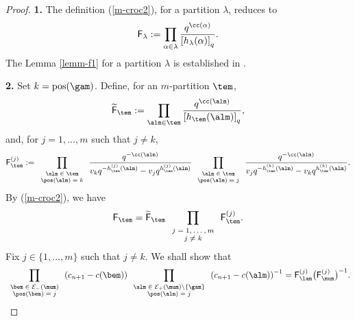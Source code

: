 \begin{proof}
{\bf 1.} The def\/inition (\ref{m-croc2}),  for a partition $\lambda$,  reduces to
\[
\textsf{F}_{\lambda}:=\prod_{\alpha\in \lambda}\frac{q^{\cc(\alpha)}}{\left[h_{\lambda}(\alpha)\right]_q} .
\]
The Lemma \ref{lemm-f1} for a partition $\lambda$ is established in \cite[Lemma 3.2]{IMO}.

{\bf 2.} Set $k=\text{pos}(\gam)$. Def\/ine, for an $m$-partition $\tem$,
\begin{gather*}%
\widetilde{\textsf{F}}
_{\tem}:=\prod_{\alm\in \tem}\frac{q^{\cc(\alm)}}{\left[h_{\tem}(\alm)\right]_q}  ,
\end{gather*}
and, for $j=1,\dots,m$ such that $j\neq k$,
\begin{gather}\label{eq-F11b}
\textsf{F}^{(j)}_{\tem}:= \prod_{\textrm{\scriptsize{$\begin{array}{c}\alm\in\tem\\ \pos(\alm)=k\end{array}$}}} \frac{q^{-\cc(\alm)}}{v_kq^{-h^{(j)}_{\tem}(\alm)} -v_jq^{h^{(j)}_{\tem}(\alm)}} \prod_{\textrm{\scriptsize{$\begin{array}{c}\alm\in\tem\\ \pos(\alm)=j\end{array}$}}} \frac{q^{-\cc(\alm)}}{v_jq^{-h^{(k)}_{\tem}(\alm)} -v_kq^{h^{(k)}_{\tem}(\alm)}}  .
\end{gather}
By (\ref{m-croc2}), we have
\begin{gather}\label{eq-F11c}
\textsf{F}_{\tem}=\widetilde{\textsf{F}}_{\tem}\prod_{\textrm{\scriptsize{$\begin{array}{c}j=1,\dots,m\\j\neq k\end{array}$}}}\textsf{F}^{(j)}_{\tem}  .
\end{gather}
Fix $j\in\{1,\dots,m\}$ such that $j\neq k$. We shall show that
\begin{gather}\label{eq-F11d}
 \prod_{\textrm{\scriptsize{$\begin{array}{c}\bem\in {\cal{E}}_-(\mum)\\ \pos(\bem)=j\end{array}$}}} \left(c_{n+1}-c(\bem)\right) \prod_{\textrm{\scriptsize{$\begin{array}{c}\alm\in {\cal{E}}_+(\mum)\backslash\{\gam\}\\ \pos(\alm)=j\end{array}$}}} \left(c_{n+1}-c(\alm)\right)^{-1}=\textsf{F}^{(j)}_{\lam}\big(\textsf{F}^{(j)}_{\mum}\big)^{-1}  .
\end{gather}


\end{proof}
